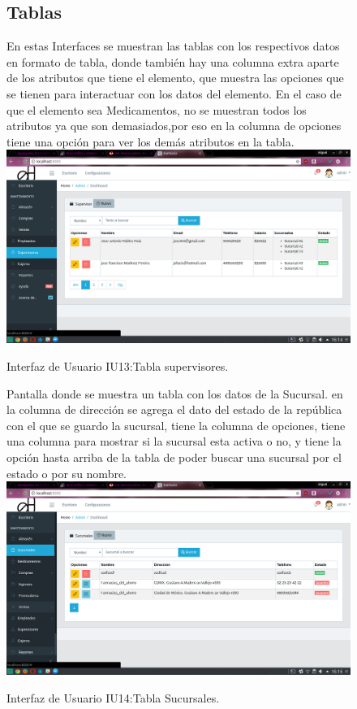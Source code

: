 \begin{figure}[htbp!]
	\begin{center}
	\subsection{Tablas}
En estas Interfaces se muestran las tablas con los respectivos datos en formato
de tabla, donde también hay una columna extra aparte de los atributos que tiene el elemento, que muestra las opciones que se tienen para interactuar con los datos
del elemento. En el caso de que el elemento sea Medicamentos, no se muestran todos los atributos ya que son demasiados,por eso en la columna de opciones tiene una opción para ver los demás atributos en la tabla.
\includegraphics[width=\textwidth]{Pantallas/tablaSupervisores}
		\caption{Interfaz de Usuario IU13:Tabla supervisores.}
	\end{center}
\end{figure}




\begin{figure}[htbp!]
	\begin{center}
	Pantalla donde se muestra un tabla con los datos de la Sucursal.
	en la columna de dirección se agrega el dato del estado de la república con el que se guardo la sucursal, tiene la columna de opciones, tiene una columna para mostrar si la sucursal esta activa o no, y tiene la opción hasta arriba de la tabla de poder buscar una sucursal por el estado o por su nombre.
\includegraphics[width=\textwidth]{Pantallas/tablaSucursales}
		\caption{Interfaz de Usuario IU14:Tabla Sucursales.}
	\end{center}
\end{figure}



